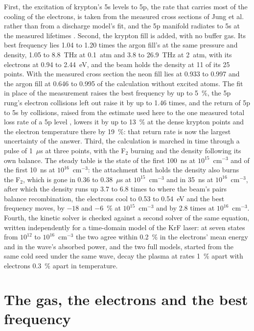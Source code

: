 \documentclass[11pt]{article}
\begin{document}
First, the excitation of krypton's 5s levels to 5p, the rate that carries most of the cooling of the electrons,
is taken from the measured cross sections of Jung et al.\ \cite{Jung2005,Jung2006} rather than from a discharge
model's fit, and the 5p manifold radiates to 5s at the measured lifetimes \cite{Dzierzega2000}. Second, the
krypton fill is added, with no buffer gas. Its best frequency lies 1.04 to 1.20 times the argon fill's at the
same pressure and density, 1.05 to 8.8~THz at 0.1~atm and 3.8 to 26.9~THz at 2~atm, with its electrons at 0.94
to 2.44~eV, and the beam holds the density at 11 of its 25 points. With the measured cross section the neon fill
lies at 0.933 to 0.997 and the argon fill at 0.646 to 0.995 of the calculation without excited atoms. The fit in
place of the measurement raises the best frequency by up to 5~\%, the 5p rung's electron collisions left out raise
it by up to 1.46 times, and the return of 5p to 5s by collisions, raised from the estimate used here to the one
measured total loss rate of a 5p level \cite{Gazeli2021}, lowers it by up to 13~\% at the dense krypton points and
the electron temperature there by 19~\%: that return rate is now the largest uncertainty of the answer. Third, the
calculation is marched in time through a pulse of 1~$\mu$s at three points, with the F$_2$ burning and the density
following its own balance. The steady table is the state of the first 100~ns at $10^{15}$~cm$^{-3}$ and of the
first 10~ns at $10^{16}$~cm$^{-3}$: the attachment that holds the density also burns the F$_2$, which is gone in
0.36 to 0.38~$\mu$s at $10^{15}$~cm$^{-3}$ and in 35~ns at $10^{16}$~cm$^{-3}$, after which the density runs up
3.7 to 6.8 times to where the beam's pairs balance recombination, the electrons cool to 0.53 to 0.54~eV and the
best frequency moves, by $-18$ and $-6$~\% at $10^{15}$~cm$^{-3}$ and by 2.8 times at $10^{16}$~cm$^{-3}$. Fourth, the
kinetic solver is checked against a second solver of the same equation, written independently for a time-domain
model of the KrF laser: at seven states from $10^{12}$ to $10^{16}$~cm$^{-3}$ the two agree within 0.2~\% in the
electrons' mean energy and in the wave's absorbed power, and the two full models, started from the same cold seed
under the same wave, decay the plasma at rates 1~\% apart with electrons 0.3~\% apart in temperature.

\section{The gas, the electrons and the best frequency}
\label{sec:model}
\end{document}
